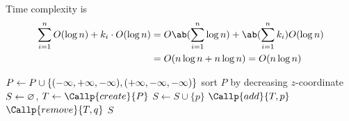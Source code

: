 \begin{solution}
    Time complexity is \begin{align*}
        \sum_{i=1}^n O(\log n) + k_i \cdot O(\log n)
            &= O\ab(\sum_{i=1}^n \log n) + \ab(\sum_{i=1}^n k_i) O(\log n)\\
            &= O(n \log n + n \log n) = O(n \log n)
    \end{align*}
    \begin{algo}
            \State $P \gets P \cup \{(-\infty, +\infty, -\infty),
                            (+\infty, -\infty, -\infty)\}$
            \State sort $P$ by decreasing $z$-coordinate
            \State $S \gets \varnothing$, $T \gets \Callp{create}{P}$
                    \State $S \gets S \cup \{p\}$
                    \State $\Callp{add}{T, p}$
                \EndIf
                    \State $\Callp{remove}{T, q}$
                \EndWhile
            \EndFor
            \State \Return $S$
        \EndFn
    \end{algo}
\end{solution}
